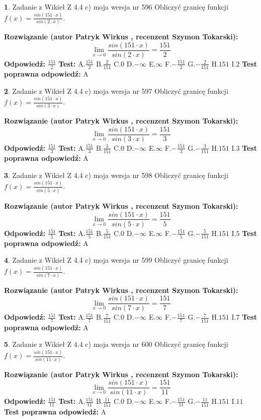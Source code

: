 \documentclass[12pt, a4paper]{article}
\theoremstyle{definition} %
\newtheorem{zad}{}
\newcommand{\zadStart}[1]{\begin{zad}#1\newline}
\newcommand{\zadStop}{\end{zad}}
\newcommand{\rozwStart}[2]{\noindent \textbf{Rozwiązanie (autor #1 , recenzent #2): }\newline}
\newcommand{\rozwStop}{\newline}
\newcommand{\odpStart}{\noindent \textbf{Odpowiedź:}\newline}
\newcommand{\odpStop}{\newline}
\newcommand{\testStart}{\noindent \textbf{Test:}\newline}
\newcommand{\testStop}{\newline}
\newcommand{\kluczStart}{\noindent \textbf{Test poprawna odpowiedź:}\newline}
\newcommand{\kluczStop}{\newline}
\begin{document}
\zadStart{Zadanie z Wikieł Z 4.4 c) moja wersja nr 596}
Obliczyć granicę funkcji $f(x)=\frac{sin(151\cdot x)}{sin(2\cdot x)}$.
\zadStop
\rozwStart{Patryk Wirkus}{Szymon Tokarski}
$$\lim\limits_{x\to 0}\frac{sin(151\cdot x)}{sin(2\cdot x)}=
\frac{151}{2}$$
\rozwStop
\odpStart
$\frac{151}{2}$
\odpStop
\testStart
A.$\frac{151}{2}$
B.$\frac{2}{151}$
C.$0$
D.$-\infty$
E.$\infty$
F.$-\frac{151}{2}$
G.$-\frac{2}{151}$
H.$151$
I.$2$
\testStop
\kluczStart
A
\kluczStop



\zadStart{Zadanie z Wikieł Z 4.4 c) moja wersja nr 597}
Obliczyć granicę funkcji $f(x)=\frac{sin(151\cdot x)}{sin(3\cdot x)}$.
\zadStop
\rozwStart{Patryk Wirkus}{Szymon Tokarski}
$$\lim\limits_{x\to 0}\frac{sin(151\cdot x)}{sin(3\cdot x)}=
\frac{151}{3}$$
\rozwStop
\odpStart
$\frac{151}{3}$
\odpStop
\testStart
A.$\frac{151}{3}$
B.$\frac{3}{151}$
C.$0$
D.$-\infty$
E.$\infty$
F.$-\frac{151}{3}$
G.$-\frac{3}{151}$
H.$151$
I.$3$
\testStop
\kluczStart
A
\kluczStop



\zadStart{Zadanie z Wikieł Z 4.4 c) moja wersja nr 598}
Obliczyć granicę funkcji $f(x)=\frac{sin(151\cdot x)}{sin(5\cdot x)}$.
\zadStop
\rozwStart{Patryk Wirkus}{Szymon Tokarski}
$$\lim\limits_{x\to 0}\frac{sin(151\cdot x)}{sin(5\cdot x)}=
\frac{151}{5}$$
\rozwStop
\odpStart
$\frac{151}{5}$
\odpStop
\testStart
A.$\frac{151}{5}$
B.$\frac{5}{151}$
C.$0$
D.$-\infty$
E.$\infty$
F.$-\frac{151}{5}$
G.$-\frac{5}{151}$
H.$151$
I.$5$
\testStop
\kluczStart
A
\kluczStop



\zadStart{Zadanie z Wikieł Z 4.4 c) moja wersja nr 599}
Obliczyć granicę funkcji $f(x)=\frac{sin(151\cdot x)}{sin(7\cdot x)}$.
\zadStop
\rozwStart{Patryk Wirkus}{Szymon Tokarski}
$$\lim\limits_{x\to 0}\frac{sin(151\cdot x)}{sin(7\cdot x)}=
\frac{151}{7}$$
\rozwStop
\odpStart
$\frac{151}{7}$
\odpStop
\testStart
A.$\frac{151}{7}$
B.$\frac{7}{151}$
C.$0$
D.$-\infty$
E.$\infty$
F.$-\frac{151}{7}$
G.$-\frac{7}{151}$
H.$151$
I.$7$
\testStop
\kluczStart
A
\kluczStop



\zadStart{Zadanie z Wikieł Z 4.4 c) moja wersja nr 600}
Obliczyć granicę funkcji $f(x)=\frac{sin(151\cdot x)}{sin(11\cdot x)}$.
\zadStop
\rozwStart{Patryk Wirkus}{Szymon Tokarski}
$$\lim\limits_{x\to 0}\frac{sin(151\cdot x)}{sin(11\cdot x)}=
\frac{151}{11}$$
\rozwStop
\odpStart
$\frac{151}{11}$
\odpStop
\testStart
A.$\frac{151}{11}$
B.$\frac{11}{151}$
C.$0$
D.$-\infty$
E.$\infty$
F.$-\frac{151}{11}$
G.$-\frac{11}{151}$
H.$151$
I.$11$
\testStop
\kluczStart
A
\kluczStop
\end{document}
